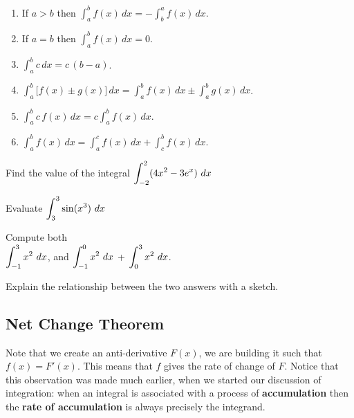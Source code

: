 \newpage
\begin{boxnote}
\begin{enumerate}
\item If $a>b$ then $\displaystyle \int_a^bf(x)\,dx=-\int_b^af(x)\,dx$. \\[1.5ex]
\item If $a=b$ then $\displaystyle \int_a^bf(x)\,dx=0$. \\[1.5ex]
\item $\displaystyle \int_a^bc\,dx=c\,(b-a)$. \\[1.5ex]
\item $\displaystyle \int_a^b\bigl[ f(x)\pm g(x) \bigr] \,dx=\int_a^bf(x)\,dx \pm\int_a^bg(x)\,dx$. \\[1.5ex]
\item $\displaystyle \int_a^bc\,f(x)\,dx=c\int_a^bf(x)\,dx$. \\[1.5ex]
\item $\displaystyle \int_a^bf(x)\,dx=\int_a^{c}f(x)\,dx+\int_{c}^bf(x)\,dx$.
\end{enumerate}
\end{boxnote}

\newpage

\problem Find the value of the integral $\displaystyle \int_{-2}^2 (4x^2 - 3e^{x})~dx$

\newpage

\problem Evaluate $\displaystyle \int_{3}^3 \sin(x^3)~dx$

\newpage

\problem Compute both  \\
$\displaystyle \int_{-1}^3 x^2 ~ dx$, and \vfill $\displaystyle \int_{-1}^0 x^2 ~ dx$ +
$\displaystyle \int_{0}^3 x^2 ~ dx$.  \vfill 

Explain the relationship between the two answers with a sketch.

\newpage

\subsection*{Net Change Theorem}

Note that we create an anti-derivative $F(x)$, we are building it such
that $f(x)=F'(x)$. This means that $f$ gives the rate of change of
$F$.  Notice that this observation was made much earlier, when we
started our discussion of integration: when an integral is associated
with a process of {\bf accumulation} then the {\bf rate of accumulation} is
always precisely the integrand.  

\newpage

